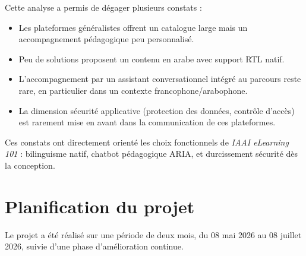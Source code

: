 \documentclass[12pt, a4paper]{report}
\begin{document}
Cette analyse a permis de dégager plusieurs constats :
\begin{itemize}
    \item Les plateformes généralistes offrent un catalogue large mais un accompagnement pédagogique peu personnalisé.
    \item Peu de solutions proposent un contenu en arabe avec support RTL natif.
    \item L'accompagnement par un assistant conversationnel intégré au parcours reste rare, en particulier dans un contexte francophone/arabophone.
    \item La dimension sécurité applicative (protection des données, contrôle d'accès) est rarement mise en avant dans la communication de ces plateformes.
\end{itemize}
Ces constats ont directement orienté les choix fonctionnels de \textit{IAAI eLearning 101} : bilinguisme natif, chatbot pédagogique ARIA, et durcissement sécurité dès la conception.

\section{Planification du projet}
Le projet a été réalisé sur une période de deux mois, du 08 mai 2026 au 08 juillet 2026, suivie d'une phase d'amélioration continue.
\end{document}
